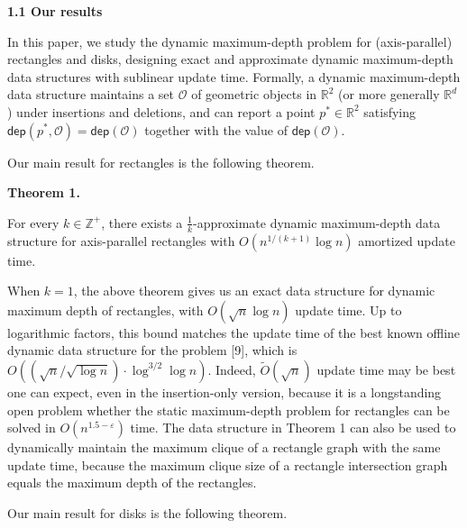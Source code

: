 \documentclass[10pt,a4paper]{article}
\begin{document}
\par
\par
\par\medskip\noindent\textbf{1.1 Our results}\par
In this paper, we study the dynamic maximum-depth problem for (axis-parallel) rectangles and disks, designing exact and approximate dynamic maximum-depth data structures with sublinear update time. Formally, a dynamic maximum-depth data structure maintains a set $\mathcal{O}$ of geometric objects in $\mathbb{R}^{2}$ (or more generally $\mathbb{R}^{d}$) under insertions and deletions, and can report a point $p^{*}\in\mathbb{R}^{2}$ satisfying $\mathsf{dep}(p^{*},\mathcal{O})=\mathsf{dep}(\mathcal{O})$ together with the value of $\mathsf{dep}(\mathcal{O})$.
\par
\par
Our main result for rectangles is the following theorem.
\par
\par
\par\medskip\noindent\textbf{Theorem 1.}\par
For every $k\in\mathbb{Z}^{+}$, there exists a $\frac{1}{k}$-approximate dynamic maximum-depth data structure for axis-parallel rectangles with $O(n^{1/(k+1)}\log n)$ amortized update time.
\par
\par
\par
When $k=1$, the above theorem gives us an exact data structure for dynamic maximum depth of rectangles, with $O(\sqrt{n}\log n)$ update time. Up to logarithmic factors, this bound matches the update time of the best known offline dynamic data structure for the problem [9], which is $O((\sqrt{n}/\sqrt{\log n})\cdot\log^{3/2}\log n)$. Indeed, $\widetilde{O}(\sqrt{n})$ update time may be best one can expect, even in the insertion-only version, because it is a longstanding open problem whether the static maximum-depth problem for rectangles can be solved in $O(n^{1.5-\varepsilon})$ time. The data structure in Theorem 1 can also be used to dynamically maintain the maximum clique of a rectangle graph with the same update time, because the maximum clique size of a rectangle intersection graph equals the maximum depth of the rectangles.
\par
\par
Our main result for disks is the following theorem.
\par
\par
\end{document}

